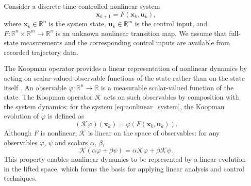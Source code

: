 \documentclass[journal]{IEEEtran}
\newcommand{\vx}{\mathbf{x}}
\newcommand{\vu}{\mathbf{u}}
\begin{document}
Consider a discrete-time controlled nonlinear system
\begin{equation}
    \vx_{k+1} = F(\vx_k, \vu_k),
    \label{eq:nonlinear_system}
\end{equation}
where $\vx_k \in \mathbb{R}^n$ is the system state, $\vu_k \in \mathbb{R}^m$ is the control input, and $F:\mathbb{R}^n \times \mathbb{R}^m \to \mathbb{R}^n$ is an unknown nonlinear transition map. We assume that full-state measurements and the corresponding control inputs are available from recorded trajectory data.

The Koopman operator provides a linear representation of nonlinear dynamics by acting on scalar-valued observable functions of the state rather than on the state itself \cite{koopman1931hamiltonian, mezic2005spectral, rowley2009spectral, brunton2022modern}. An observable $\varphi:\mathbb{R}^n\to\mathbb{R}$ is a measurable scalar-valued function of the state. The Koopman operator $\mathcal{K}$ acts on such observables by composition with the system dynamics: for the system \eqref{eq:nonlinear_system}, the Koopman evolution of $\varphi$ is defined as
\begin{equation}
    (\mathcal{K}\varphi)(\vx_k) = \varphi(F(\vx_k,\vu_k)).
    \label{eq:koopman_operator}
\end{equation}
Although $F$ is nonlinear, $\mathcal{K}$ is linear on the space of observables: for any observables $\varphi$, $\psi$ and scalars $\alpha$, $\beta$,
\begin{equation}
    \mathcal{K}(\alpha \varphi + \beta \psi)
    = \alpha \mathcal{K}\varphi + \beta \mathcal{K}\psi.
    \label{eq:koopman_linearity}
\end{equation}
This property enables nonlinear dynamics to be represented by a linear evolution in the lifted space, which forms the basis for applying linear analysis and control techniques.
\end{document}
